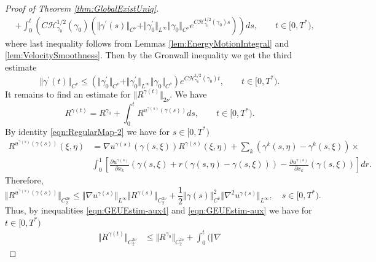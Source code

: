 \documentclass[11pt,a4paper,reqno]{amsart}%
\newcommand\half{\frac12}
\theoremstyle{plain}
\theoremstyle{remark}
\theoremstyle{plain}
\numberwithin{equation}{section}
\def\suml{\sum\limits}
\begin{document}
\begin{proof}[Proof of Theorem \ref{thm:GlobalExistUniq}]
\begin{align}
&+\int_0^t(C\mathcal{H}_{\gamma_0}^{1/2}(\gamma_0)(\Vert \gamma^\prime(s)\Vert_{C^{\nu}}+\Vert \gamma^\prime_0\Vert_{L^{\infty}}\Vert \gamma_0\Vert_{C^{\nu}}e^{C\mathcal{H}_{\gamma_0}^{1/2}(\gamma_0)s}))ds,\qquad t\in[0,T^*),
\end{align}
where last inequality follows from Lemmas
\ref{lem:EnergyMotionIntegral} and \ref{lem:VelocitySmoothness}.
Then by the Gronwall inequality we get the third estimate
\begin{equation}
\Vert \gamma^\prime(t)\Vert_{C^{\nu}}\leq(\Vert \gamma^\prime_0\Vert_{C^{\nu}}+\Vert \gamma^\prime_0\Vert_{L^{\infty}}\Vert \gamma_0\Vert_{C^{\nu}})e^{C\mathcal{H}_{\gamma_0}^{1/2}(\gamma_0)t},\qquad t\in[0,T^*).\label{eqn:GEUEstim-3}
\end{equation}
It remains to find an estimate for $\Vert R^{\gamma(t)}\Vert_{2\nu}$. We
have
\begin{equation}
R^{\gamma(t)}=R^{\gamma_0}+\int_0^tR^{u^{\gamma(s)}(\gamma(s))}ds,\qquad t\in[0,T^*).
\end{equation}
By identity \eqref{eqn:RegularMap-2} we have for $s\in[0,T^*)$
\begin{align}
R^{u^{\gamma(s)}(\gamma(s))}(\xi,\eta)&=\nabla
u^{\gamma(s)}(\gamma(s,\xi))R^{\gamma(s)}(\xi,\eta)+
\suml_k(\gamma^k(s,\eta)-\gamma^k(s,\xi))\times\nonumber\\
&\int_0^1\left[\frac{\partial u^{\gamma(s)}}{\partial
x_k}(\gamma(s,\xi)+r(\gamma(s,\eta)-\gamma(s,\xi)))-\frac{\partial
u^{\gamma(s)}}{\partial
x_k}(\gamma(s,\xi))\right]dr.\label{eqn:GEUEstim-aux3}
\end{align}
Therefore,
\begin{equation}
\Vert R^{u^{\gamma(s)}(\gamma(s))}\Vert_{{C}_2^{2\nu}}\leq \Vert \nabla
u^{\gamma(s)}\Vert_{L^{\infty}}\Vert R^{\gamma(s)}\Vert_{{C}_2^{2\nu}}+\frac{1}{2}\Vert \gamma(s)\Vert_{C^{\nu}}^2\Vert \nabla^2
u^{\gamma(s)}\Vert_{L^{\infty}},\quad s\in[0,T^*).\label{eqn:GEUEstim-aux4}
\end{equation}
Thus, by inequalities \eqref{eqn:GEUEstim-aux4} and
\eqref{eqn:GEUEstim-aux} we have for $t\in[0,T^*)$
\begin{align}
\Vert R^{\gamma(t)}\Vert_{{C}_2^{2\nu}}&\leq\Vert R^{\gamma_0}\Vert_{{C}_2^{2\nu}}+\int_0^t(\Vert \nabla

\end{align}
\end{proof}
\end{document}
